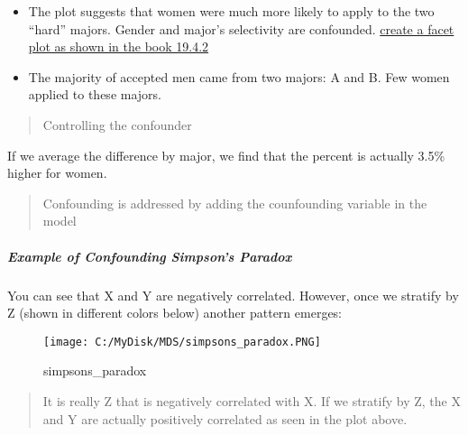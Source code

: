 \documentclass[]{article}
\newenvironment{Shaded}{\begin{snugshade}}{\end{snugshade}}
\newcommand{\DataTypeTok}[1]{\textcolor[rgb]{0.13,0.29,0.53}{#1}}
\newcommand{\KeywordTok}[1]{\textcolor[rgb]{0.13,0.29,0.53}{\textbf{#1}}}
\newcommand{\NormalTok}[1]{#1}
\newcommand{\OperatorTok}[1]{\textcolor[rgb]{0.81,0.36,0.00}{\textbf{#1}}}
\newcommand{\StringTok}[1]{\textcolor[rgb]{0.31,0.60,0.02}{#1}}
\providecommand{\tightlist}{%
  \setlength{\itemsep}{0pt}\setlength{\parskip}{0pt}}
\let\oldsubparagraph\subparagraph
\renewcommand{\subparagraph}[1]{\oldsubparagraph{#1}\mbox{}}
\begin{document}
\begin{itemize}
\tightlist
\item
  The plot suggests that women were much more likely to apply to the two
  ``hard'' majors. Gender and major's selectivity are confounded.
  \href{https://rafalab.github.io/dsbook/association-is-not-causation.html}{create
  a facet plot as shown in the book 19.4.2}
\item
  The majority of accepted men came from two majors: A and B. Few women
  applied to these majors.
\end{itemize}

\begin{quote}
Controlling the confounder
\end{quote}

\begin{Shaded}
\end{Shaded}

If we average the difference by major, we find that the percent is
actually 3.5\% higher for women.

\begin{quote}
Confounding is addressed by adding the counfounding variable in the
model
\end{quote}

\hypertarget{example-of-confounding-simpsons-paradox}{%
\subparagraph{Example of Confounding Simpson's
Paradox}\label{example-of-confounding-simpsons-paradox}}

You can see that X and Y are negatively correlated. However, once we
stratify by Z (shown in different colors below) another pattern emerges:

\begin{figure}
\centering
\texttt{[image: C:/MyDisk/MDS/simpsons\_paradox.PNG]}
\caption{simpsons\_paradox}
\end{figure}

\begin{quote}
It is really Z that is negatively correlated with X. If we stratify by
Z, the X and Y are actually positively correlated as seen in the plot
above.
\end{quote}
\end{document}
